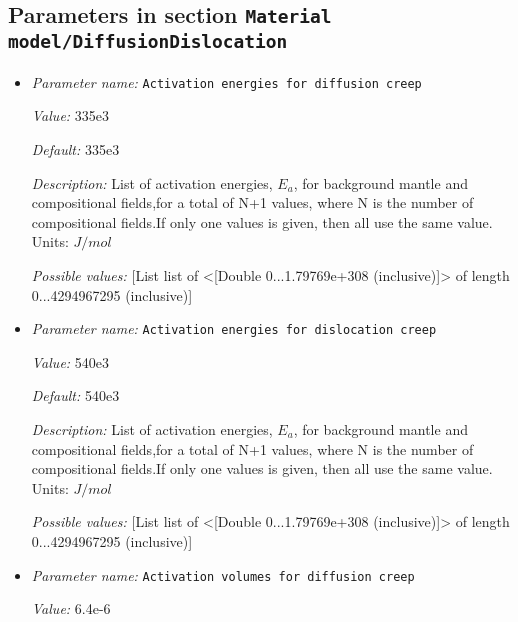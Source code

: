 \subsection{Parameters in section \tt Material model/DiffusionDislocation}
\label{parameters:Material_20model/DiffusionDislocation}

\begin{itemize}
\item {\it Parameter name:} {\tt Activation energies for diffusion creep}
\label{parameters:Material model/DiffusionDislocation/Activation energies for diffusion creep}


{\it Value:} 335e3


{\it Default:} 335e3


{\it Description:} List of activation energies, $E_a$, for background mantle and compositional fields,for a total of N+1 values, where N is the number of compositional fields.If only one values is given, then all use the same value.  Units: $J / mol$


{\it Possible values:} [List list of <[Double 0...1.79769e+308 (inclusive)]> of length 0...4294967295 (inclusive)]
\item {\it Parameter name:} {\tt Activation energies for dislocation creep}
\label{parameters:Material model/DiffusionDislocation/Activation energies for dislocation creep}


{\it Value:} 540e3


{\it Default:} 540e3


{\it Description:} List of activation energies, $E_a$, for background mantle and compositional fields,for a total of N+1 values, where N is the number of compositional fields.If only one values is given, then all use the same value.  Units: $J / mol$


{\it Possible values:} [List list of <[Double 0...1.79769e+308 (inclusive)]> of length 0...4294967295 (inclusive)]
\item {\it Parameter name:} {\tt Activation volumes for diffusion creep}
\label{parameters:Material model/DiffusionDislocation/Activation volumes for diffusion creep}


{\it Value:} 6.4e-6



\end{itemize}
